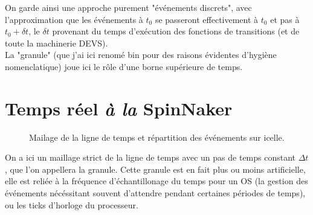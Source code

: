 \documentclass{article}
\begin{document}
		On garde ainsi une approche purement "\'ev\'enements discrets", avec l'approximation que les \'ev\'enements \`a $t_0$ se passeront effectivement \`a $t_0$ et pas \`a $t_0+\delta t$, le $\delta t$ provenant du temps d'ex\'ecution des fonctions de transitions (et de toute la machinerie DEVS).\\
		La "granule" (que j'ai ici renom\'e {\color{green}bin} pour des raisons \'evidentes d'hygi\`ene nomenclatique) joue ici le r\^ole d'une borne sup\'erieure de temps.

	\section*{Temps r\'eel \emph{\`a la} SpinNaker}
		\begin{figure}[H]
			\begin{center}
			\end{center}
			\caption{Mailage de la ligne de temps et r\'epartition des \'ev\'enements sur icelle.}\label{fig:rtsn}
		\end{figure}
		On a ici un maillage strict de la ligne de temps avec un pas de temps constant $\Delta t$, que l'on appellera la granule. Cette granule est en fait plus ou moins artificielle, elle est reli\'ee \`a la fr\'equence d'\'echantillonage du temps pour un OS (la gestion des \'ev\'enements n\'ec\'essitant souvent d'attendre pendant certaines p\'eriodes de temps), ou les ticks d'horloge du processeur.
\end{document}

